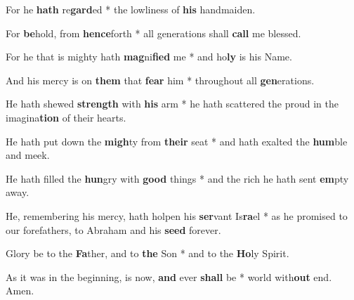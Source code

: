 \begin{multicols}{2}
	For he \textbf{hath} re\textbf{gard}ed * the lowliness of \textbf{his} handmaiden.
	
	For \textbf{be}hold, from \textbf{hence}forth * all generations shall \textbf{call} me blessed.
	
	For he that is mighty hath \textbf{mag}ni\textbf{fied} me * and ho\textbf{ly} is his Name.
	
	And his mercy is on \textbf{them} that \textbf{fear} him * throughout all \textbf{gen}erations.
	
	He hath shewed \textbf{strength} with \textbf{his} arm * he hath scattered the proud in the imagina\textbf{tion} of their hearts.
	
	He hath put down the \textbf{migh}ty from \textbf{their} seat * and hath exalted the \textbf{hum}ble and meek.
	
	He hath filled the \textbf{hun}gry with \textbf{good} things * and the rich he hath sent \textbf{em}pty away.
	
	He, remembering his mercy, hath holpen his \textbf{ser}vant Is\textbf{ra}el * as he promised to our forefathers, to Abraham and his \textbf{seed} forever.
	
	Glory be to the \textbf{Fa}ther, and to \textbf{the} Son * and to the \textbf{Ho}ly Spirit.
	
	As it was in the beginning, is now, \textbf{and} ever \textbf{shall} be * world with\textbf{out} end. Amen.
\end{multicols}
